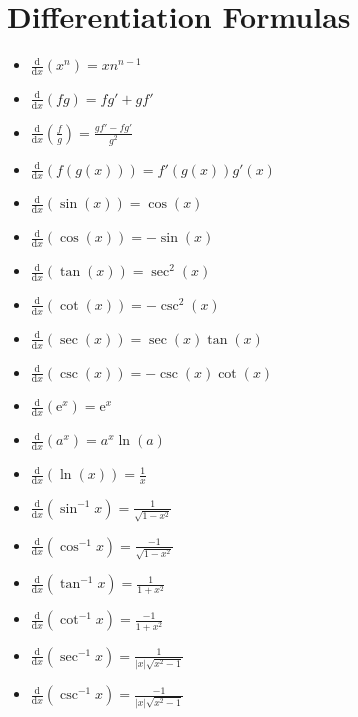 \documentclass[letterpaper, 12pt]{article}
\renewcommand*{\arcsin}{\sin^{-1}}
\renewcommand*{\arccos}{\cos^{-1}}
\renewcommand*{\arctan}{\tan^{-1}}
\newcommand*{\arccot}{\cot^{-1}}
\newcommand*{\arcsec}{\sec^{-1}}
\newcommand*{\arccsc}{\csc^{-1}}
\newcommand*{\diff}{\mathrm{d}}
\newcommand*{\e}{\mathrm{e}}
\begin{document}
\section{Differentiation Formulas}
\begin{itemize}
  \item \( \frac{\diff}{\diff{x}}(x^{n}) = xn^{n-1} \)
  \item \( \frac{\diff}{\diff{x}}(fg) = fg' + gf' \)
  \item \( \frac{\diff}{\diff{x}}(\frac{f}{g}) = \frac{gf'-fg'}{g^{2}} \)
  \item \( \frac{\diff}{\diff{x}}(f(g(x))) = f'(g(x))g'(x) \)
  \item \( \frac{\diff}{\diff{x}}(\sin(x)) = \cos(x) \)
  \item \( \frac{\diff}{\diff{x}}(\cos(x)) = -\sin(x) \)
  \item \( \frac{\diff}{\diff{x}}(\tan(x)) = \sec^{2}(x) \)
  \item \( \frac{\diff}{\diff{x}}(\cot(x)) = -\csc^{2}(x) \)
  \item \( \frac{\diff}{\diff{x}}(\sec(x)) = \sec(x)\tan(x) \)
  \item \( \frac{\diff}{\diff{x}}(\csc(x)) = -\csc(x)\cot(x) \)
  \item \( \frac{\diff}{\diff{x}}(\e^{x}) = \e^{x} \)
  \item \( \frac{\diff}{\diff{x}}(a^{x}) = a^{x}\ln(a) \)
  \item \( \frac{\diff}{\diff{x}}(\ln(x)) = \frac{1}{x} \)
  \item \( \frac{\diff}{\diff{x}}(\arcsin{x}) = \frac{1}{\sqrt{1-x^{2}}} \)
  \item \( \frac{\diff}{\diff{x}}(\arccos{x}) =
           \frac{-1}{\sqrt{1-x^{2}}} \)
  \item \( \frac{\diff}{\diff{x}}(\arctan{x}) = \frac{1}{1+x^{2}} \)
  \item \( \frac{\diff}{\diff{x}}(\arccot{x}) = \frac{-1}{1+x^{2}} \)
  \item \( \frac{\diff}{\diff{x}}(\arcsec{x}) = \frac{1}{|x|\sqrt{x^{2}-1}} \)
  \item \( \frac{\diff}{\diff{x}}(\arccsc{x}) = \frac{-1}{|x|\sqrt{x^{2}-1}} \)
\end{itemize}
\end{document}
